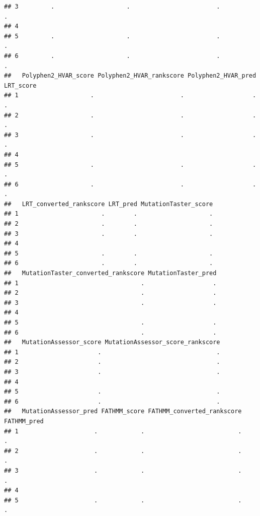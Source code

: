 \documentclass[
]{article}
\begin{document}
\begin{verbatim}
## 3         .                    .                        .                   .
## 4                                                                            
## 5         .                    .                        .                   .
## 6         .                    .                        .                   .
##   Polyphen2_HVAR_score Polyphen2_HVAR_rankscore Polyphen2_HVAR_pred LRT_score
## 1                    .                        .                   .         .
## 2                    .                        .                   .         .
## 3                    .                        .                   .         .
## 4                                                                            
## 5                    .                        .                   .         .
## 6                    .                        .                   .         .
##   LRT_converted_rankscore LRT_pred MutationTaster_score
## 1                       .        .                    .
## 2                       .        .                    .
## 3                       .        .                    .
## 4                                                      
## 5                       .        .                    .
## 6                       .        .                    .
##   MutationTaster_converted_rankscore MutationTaster_pred
## 1                                  .                   .
## 2                                  .                   .
## 3                                  .                   .
## 4                                                       
## 5                                  .                   .
## 6                                  .                   .
##   MutationAssessor_score MutationAssessor_score_rankscore
## 1                      .                                .
## 2                      .                                .
## 3                      .                                .
## 4                                                        
## 5                      .                                .
## 6                      .                                .
##   MutationAssessor_pred FATHMM_score FATHMM_converted_rankscore FATHMM_pred
## 1                     .            .                          .           .
## 2                     .            .                          .           .
## 3                     .            .                          .           .
## 4                                                                          
## 5                     .            .                          .           .

\end{verbatim}
\end{document}
